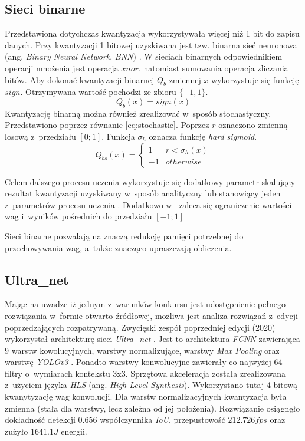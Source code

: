 \subsection{Sieci binarne}

Przedstawiona dotychczas kwantyzacja wykorzystywała więcej niż 1 bit do zapisu danych.
Przy kwantyzacji 1 bitowej uzyskiwana jest tzw. binarna sieć neuronowa (ang. \emph{Binary Neural Network}, \emph{BNN}) \cite{qnn}.
W sieciach binarnych odpowiednikiem operacji mnożenia jest operacja $xnor$, natomiast sumowania operacja zliczania bitów. 
Aby dokonać kwantyzacji binarnej $Q_b$ zmiennej $x$ wykorzystuje się funkcję $sign$. 
Otrzymywana wartość pochodzi ze zbioru $\{-1,1\}$.
\begin{equation}
Q_b(x) = sign(x)
\label{eq:binarize}
\end{equation}
Kwantyzację binarną można również zrealizować w~sposób stochastyczny\cite{qnn}.
Przedstawiono poprzez równanie \eqref{eq:stochastic}. 
Poprzez $r$ oznaczono zmienną losową z~przedziału $[0;1]$. 
Funkcja $\sigma_h$ oznacza funkcję \emph{hard sigmoid}.
\begin{equation}
Q_{bs}(x) =
\begin{cases}
1 & r < \sigma_h(x) \\
-1 & otherwise
\end{cases}
\label{eq:stochastic}
\end{equation}

Celem dalszego procesu uczenia wykorzystuje się dodatkowy parametr skalujący rezultat kwantyzacji uzyskiwany w~sposób analityczny \cite{xnor_net} lub stanowiący jeden z~parametrów procesu uczenia \cite{xnor_net++}.
Dodatkowo w~\cite{qnn} zaleca się ograniczenie wartości wag i~wyników pośrednich do przedziału $[-1;1]$

Sieci binarne pozwalają na znaczą redukcję pamięci potrzebnej do przechowywania wag, a~także znacząco upraszczają obliczenia.

\subsection{Ultra\_net}

Mając na uwadze iż jednym z~warunków konkursu jest udostępnienie pełnego rozwiązania w~formie otwarto-źródłowej, możliwa jest analiza rozwiązań z~edycji poprzedzających rozpatrywaną.
Zwycięski zespół poprzedniej edycji (2020) wykorzystał architekturę sieci \emph{Ultra\_net} \cite{ultra_net}. 
Jest to architektura \emph{FCNN} zawierająca 9 warstw kowolucyjnych, warstwy normalizujące, warstwy \textit{Max Pooling} oraz warstwę \emph{YOLOv3} \cite{yolov3}.
Ponadto warstwy konwolucyjne zawierały co najwyżej 64 filtry o~wymiarach kontekstu 3x3.
Sprzętowa akceleracja została zrealizowana z~użyciem języka \emph{HLS} (ang. \emph{High Level Synthesis}). 
Wykorzystano tutaj 4 bitową kwanytyzację wag konwolucji. 
Dla warstw normalizacyjnych kwantyzacja była zmienna (stała dla warstwy, lecz zależna od jej  położenia).
Rozwiązanie osiągnęło dokładność detekcji $0.656$ współczynnika \emph{IoU}, przepustowość $212.726 fps$ oraz zużyło $1641.1 J$ energii. 

